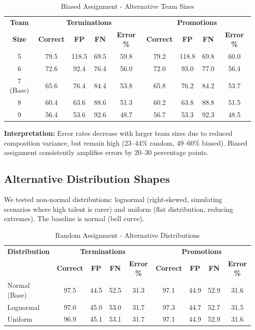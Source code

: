 \documentclass[12pt]{article}
\begin{document}
\begin{table}[h]
\centering
\caption{Biased Assignment - Alternative Team Sizes}
\label{tab:sens-teamsize-biased}
\small
\begin{tabular}{ccccccccc}
\toprule
\textbf{Team} & \multicolumn{4}{c}{\textbf{Terminations}} & \multicolumn{4}{c}{\textbf{Promotions}} \\
\textbf{Size} & \textbf{Correct} & \textbf{FP} & \textbf{FN} & \textbf{Error \%} & \textbf{Correct} & \textbf{FP} & \textbf{FN} & \textbf{Error \%} \\
\midrule
5 & 79.5 & 118.5 & 69.5 & 59.8 & 79.2 & 118.8 & 69.8 & 60.0 \\
6 & 72.6 & 92.4 & 76.4 & 56.0 & 72.0 & 93.0 & 77.0 & 56.4 \\
7 (Base) & 65.6 & 76.4 & 84.4 & 53.8 & 65.8 & 76.2 & 84.2 & 53.7 \\
8 & 60.4 & 63.6 & 88.6 & 51.3 & 60.2 & 63.8 & 88.8 & 51.5 \\
9 & 56.4 & 53.6 & 92.6 & 48.7 & 56.7 & 53.3 & 92.3 & 48.5 \\
\bottomrule
\end{tabular}
\end{table}

\textbf{Interpretation:} Error rates decrease with larger team sizes due to reduced composition variance, but remain high (23--44\% random, 49--60\% biased). Biased assignment consistently amplifies errors by 20--30 percentage points.

\subsection{Alternative Distribution Shapes}

We tested non-normal distributions: lognormal (right-skewed, simulating scenarios where high talent is rarer) and uniform (flat distribution, reducing extremes). The baseline is normal (bell curve).

\begin{table}[h]
\centering
\caption{Random Assignment - Alternative Distributions}
\label{tab:sens-dist-random}
\small
\begin{tabular}{lcccccccc}
\toprule
\textbf{Distribution} & \multicolumn{4}{c}{\textbf{Terminations}} & \multicolumn{4}{c}{\textbf{Promotions}} \\
 & \textbf{Correct} & \textbf{FP} & \textbf{FN} & \textbf{Error \%} & \textbf{Correct} & \textbf{FP} & \textbf{FN} & \textbf{Error \%} \\
\midrule
Normal (Base) & 97.5 & 44.5 & 52.5 & 31.3 & 97.1 & 44.9 & 52.9 & 31.6 \\
Lognormal & 97.0 & 45.0 & 53.0 & 31.7 & 97.3 & 44.7 & 52.7 & 31.5 \\
Uniform & 96.9 & 45.1 & 53.1 & 31.7 & 97.1 & 44.9 & 52.9 & 31.6 \\
\bottomrule
\end{tabular}
\end{table}
\end{document}
